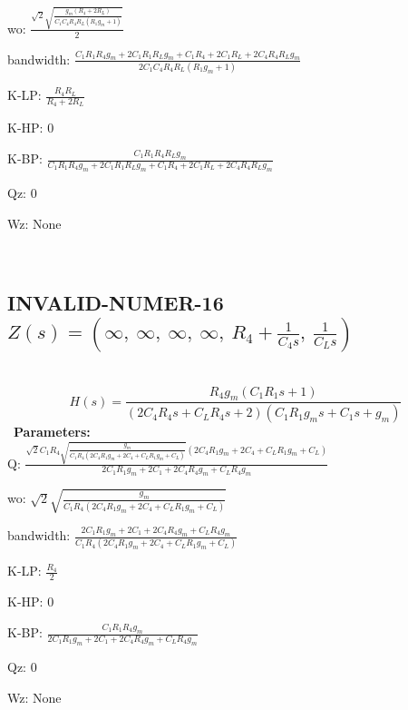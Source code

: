 \documentclass{article}
\begin{document}
wo: $\frac{\sqrt{2} \sqrt{\frac{g_{m} \left(R_{4} + 2 R_{L}\right)}{C_{1} C_{4} R_{4} R_{L} \left(R_{1} g_{m} + 1\right)}}}{2}$\ 

bandwidth: $\frac{C_{1} R_{1} R_{4} g_{m} + 2 C_{1} R_{1} R_{L} g_{m} + C_{1} R_{4} + 2 C_{1} R_{L} + 2 C_{4} R_{4} R_{L} g_{m}}{2 C_{1} C_{4} R_{4} R_{L} \left(R_{1} g_{m} + 1\right)}$\ 

K-LP: $\frac{R_{4} R_{L}}{R_{4} + 2 R_{L}}$\ 

K-HP: $0$\ 

K-BP: $\frac{C_{1} R_{1} R_{4} R_{L} g_{m}}{C_{1} R_{1} R_{4} g_{m} + 2 C_{1} R_{1} R_{L} g_{m} + C_{1} R_{4} + 2 C_{1} R_{L} + 2 C_{4} R_{4} R_{L} g_{m}}$\ 

Qz: $0$\ 

Wz: $\text{None}$\ 

\ 

\subsection{INVALID-NUMER-16 $Z(s) = \left( \infty, \  \infty, \  \infty, \  \infty, \  R_{4} + \frac{1}{C_{4} s}, \  \frac{1}{C_{L} s}\right)$ } \ 
\textbf{\[H(s) = \frac{R_{4} g_{m} \left(C_{1} R_{1} s + 1\right)}{\left(2 C_{4} R_{4} s + C_{L} R_{4} s + 2\right) \left(C_{1} R_{1} g_{m} s + C_{1} s + g_{m}\right)}\] } \ 
\textbf{Parameters:}\\ 

Q: $\frac{\sqrt{2} C_{1} R_{4} \sqrt{\frac{g_{m}}{C_{1} R_{4} \left(2 C_{4} R_{1} g_{m} + 2 C_{4} + C_{L} R_{1} g_{m} + C_{L}\right)}} \left(2 C_{4} R_{1} g_{m} + 2 C_{4} + C_{L} R_{1} g_{m} + C_{L}\right)}{2 C_{1} R_{1} g_{m} + 2 C_{1} + 2 C_{4} R_{4} g_{m} + C_{L} R_{4} g_{m}}$\ 

wo: $\sqrt{2} \sqrt{\frac{g_{m}}{C_{1} R_{4} \left(2 C_{4} R_{1} g_{m} + 2 C_{4} + C_{L} R_{1} g_{m} + C_{L}\right)}}$\ 

bandwidth: $\frac{2 C_{1} R_{1} g_{m} + 2 C_{1} + 2 C_{4} R_{4} g_{m} + C_{L} R_{4} g_{m}}{C_{1} R_{4} \left(2 C_{4} R_{1} g_{m} + 2 C_{4} + C_{L} R_{1} g_{m} + C_{L}\right)}$\ 

K-LP: $\frac{R_{4}}{2}$\ 

K-HP: $0$\ 

K-BP: $\frac{C_{1} R_{1} R_{4} g_{m}}{2 C_{1} R_{1} g_{m} + 2 C_{1} + 2 C_{4} R_{4} g_{m} + C_{L} R_{4} g_{m}}$\ 

Qz: $0$\ 

Wz: $\text{None}$\ 

\ 
\end{document}
